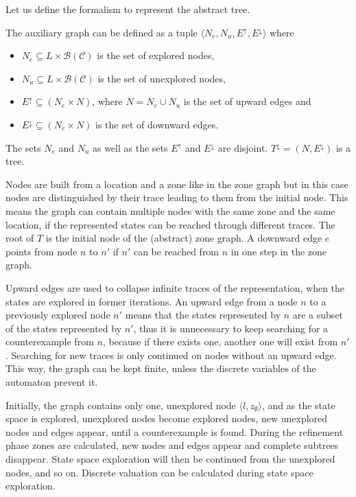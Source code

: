 Let us define the formalism to represent the abstract tree.

\begin{dfn}
	The auxiliary graph can be defined as a tuple $\langle N_e, N_u, E^\uparrow, E^\downarrow \rangle$ where
	\begin{itemize}
		\item $N_e \subseteq L \times \mathcal{B}(\mathcal{C})$ is the set of explored nodes,
		\item $N_u \subseteq L \times \mathcal{B}(\mathcal{C})$  is the set of unexplored nodes,
		\item $E^\uparrow \subseteq (N_e \times N)$, where $N = N_e \cup N_u$ is the set of upward edges and
		\item $E^\downarrow \subseteq (N_e \times N)$  is the set of downward edges.
	\end{itemize}
	 The sets $N_e$ and $N_u$ as well as the sets $E^\uparrow$ and $E^\downarrow$ are disjoint. $T^\downarrow=(N,E^\downarrow)$ is a tree.
\end{dfn}
 
Nodes are built from a location and a zone like in the zone graph but in this case nodes are distinguished by their trace leading to them from the initial node. This means the graph can contain multiple nodes with the same zone and the same location, if the represented states can be reached through different traces. The root of $T$ is the initial node of the (abstract) zone graph. A downward edge $e$ points from node $n$ to $n'$ if $n'$ can be reached from $n$ in one step in the zone graph. %

Upward edges are used to collapse infinite traces of the representation, when the states are explored in former iterations. An upward edge from a node $n$ to a previously explored node $n'$ means that the states
represented by $n$ are a subset of the states represented by $n'$, thus it is unnecessary to keep searching for a
counterexample from $n$, because if there exists one, another one will exist
from $n'$. Searching for new traces is only continued on nodes without an upward edge. This way, the graph can be kept finite, unless the discrete variables of the automaton prevent it.

Initially, the graph contains only one, unexplored node $\langle l, z_{\emptyset} \rangle$, and as the state space is explored, unexplored nodes become explored nodes, new unexplored nodes and edges appear, until a counterexample is found. During the refinement phase zones are calculated, new nodes and edges appear and complete subtrees disappear. State space exploration will then be continued from the unexplored nodes, and so on. Discrete valuation can be calculated during state space exploration.

